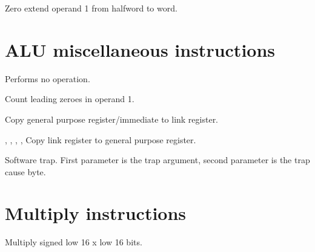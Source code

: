 Zero extend operand 1 from halfword to word.

\section{ALU miscellaneous instructions}

Performs no operation.

Count leading zeroes in operand 1.

Copy general purpose register/immediate to link register.

,
,
,
,
Copy link register to general purpose register.

Software trap. First parameter is the trap argument, second parameter is the
trap cause byte.

\section{Multiply instructions}

Multiply signed low 16 x low 16 bits.

